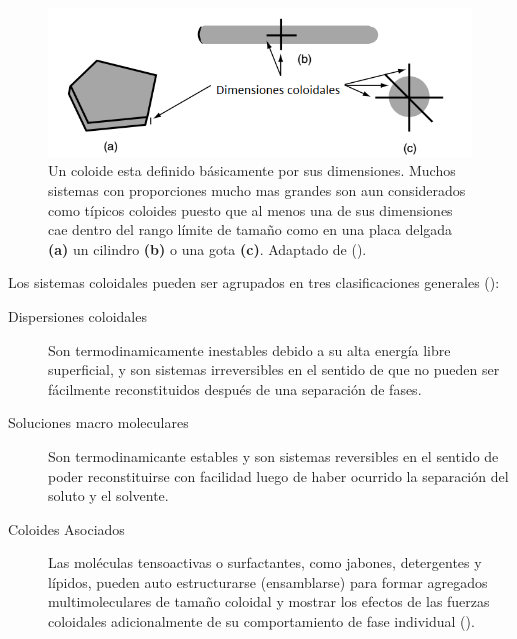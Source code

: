 
\begin{figure}
\centering
\includegraphics[width=\textwidth]{Graphics/Dimensiones.png}
\caption[Dimensiones coloidales]{Un coloide esta definido básicamente por sus dimensiones. Muchos sistemas con proporciones mucho mas grandes son aun considerados como típicos coloides puesto que al menos una de sus dimensiones cae dentro del rango límite de tamaño como en una placa delgada \textbf{(a)} un cilindro \textbf{(b)} o una gota \textbf{(c)}. Adaptado de (\cite{Drew}). }
\label{fig:Dimensions}
\end{figure}

Los sistemas coloidales pueden ser agrupados en tres clasificaciones generales (\cite{Duncan}):
\begin{description}
  \item[Dispersiones coloidales]
    Son termodinamicamente inestables debido a su alta energía libre superficial, y son sistemas irreversibles en el sentido de que no pueden ser fácilmente reconstituidos después de una separación de fases.
  \item[Soluciones macro moleculares] 
    Son termodinamicante estables y son sistemas reversibles en el sentido de poder reconstituirse con facilidad luego de haber ocurrido la separación del soluto y el solvente.
  \item[Coloides Asociados] 
    Las moléculas tensoactivas o surfactantes, como jabones, detergentes y lípidos, pueden auto estructurarse (ensamblarse) para formar agregados multimoleculares de tamaño coloidal y mostrar los efectos de las fuerzas coloidales adicionalmente de su comportamiento de fase individual
    (\cite{Goodwin}).
\end{description}

